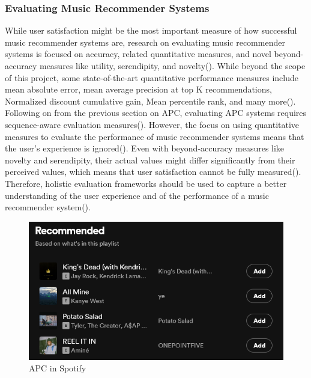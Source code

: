 \documentclass{l4proj}
\begin{document}
\subsubsection{Evaluating Music Recommender Systems} While user satisfaction might be the most important measure of how successful music recommender systems are, research on evaluating music recommender systems is focused on accuracy, related quantitative measures, and novel beyond-accuracy measures like utility, serendipity, and novelty(\cite{Schedl_Zamani_Chen_Deldjoo_Elahi_2018}). While beyond the scope of this project, some state-of-the-art quantitative performance measures include mean absolute error, mean average precision at top K recommendations, Normalized discount cumulative gain, Mean percentile rank, and many more(\cite{Schedl_Zamani_Chen_Deldjoo_Elahi_2018}). Following on from the previous section on APC, evaluating APC systems requires sequence-aware evaluation measures(\cite{Schedl_Zamani_Chen_Deldjoo_Elahi_2018}). However, the focus on using quantitative measures to evaluate the performance of music recommender systems means that the user's experience is ignored(\cite{Schedl_Zamani_Chen_Deldjoo_Elahi_2018}). Even with beyond-accuracy measures like novelty and serendipity, their actual values might differ significantly from their perceived values, which means that user satisfaction cannot be fully measured(\cite{Schedl_Zamani_Chen_Deldjoo_Elahi_2018}). Therefore, holistic evaluation frameworks should be used to capture a better understanding of the user experience and of the performance of a music recommender system(\cite{Schedl_Zamani_Chen_Deldjoo_Elahi_2018}).
\begin{figure}
    \centering
    \includegraphics[width=0.85\linewidth]{images/APC.png}
    \caption{APC in Spotify}
    \label{fig:apc}
\end{figure}
\end{document}
